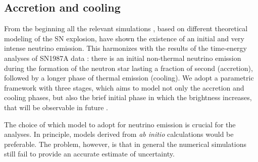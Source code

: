 \documentclass[a4paper,11pt]{article}
\begin{document}
\subsection{Accretion and cooling}
From the beginning all the relevant simulations \cite{ Colgate1966ApJ...143..626C,Wilson1971,Nadyozhin:1978zz, Bethe:1985sox, 1988ApJ...334..891B,1990PhT....43i..24B,Woosley_2005,2007PhR...442...38J,Raffelt:2012kt,Janka:2012wk,RevModPhys.85.245,Foglizzo_2015,Mirizzi:2015eza,Horiuchi_2018,Janka_2017,Janka:2017vlw,7097756f985a410398cc602775095da9, Mezzacappa:2020oyq, Burrows:2020qrp, woosley1986physics}, based on different theoretical modeling of the SN explosion, have shown the existence of an initial and very intense neutrino emission. This harmonizes with the results of the time-energy analyses of SN1987A data \cite{Loredo:2001rx,Pagliaroli:2009qy,Pagliaroli:2007sda,DedinNeto:2023hhp}: there is  an initial non-thermal neutrino emission during the formation of the neutron star  lasting a fraction of second (accretion), followed by a  longer phase of thermal emission (cooling).
We adopt a  parametric framework \cite{sym13101851} with three stages, which aims to model not only the accretion  and cooling phases, but also  the brief initial phase in which the brightness increases, that will be observable
in future \cite{sym13101851, PhysRevD.80.087301, Pagliaroli:2009qy}. 

The choice of which model to adopt for neutrino emission is crucial for the analyses. In principle, models derived from \emph{ab initio} calculations would be preferable. The problem, however, is that in general %
the  numerical simulations still  fail to provide an accurate estimate of uncertainty.
\end{document}
